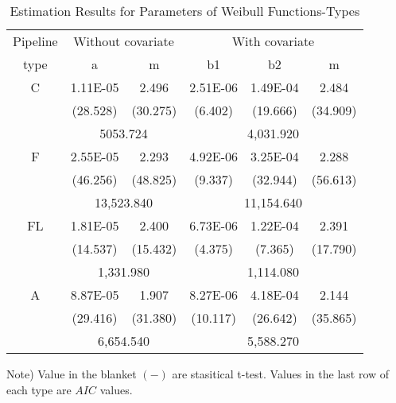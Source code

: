\documentclass[a4paper,oneside,onecolumn,preprint,10pt,authoryear]{elsarticle}
\begin{document}
\begin{table}%
\label{table51}
\caption{Estimation Results for Parameters of Weibull Functions-Types}
{\small
\begin{center}
\begin{tabular}{l|ll|lll}
\hline
\multicolumn{1}{c|}{Pipeline} & \multicolumn{2}{c|}{Without covariate} & \multicolumn{3}{c}{With covariate} \\ 
\multicolumn{1}{c|}{type} & \multicolumn{1}{c}{a} & \multicolumn{1}{c|}{m} & \multicolumn{1}{c}{b1} & \multicolumn{1}{c}{b2} & \multicolumn{1}{c}{m} \\ 
\hline
\multicolumn{1}{c|}{C} & \multicolumn{1}{c}{1.11E-05} & \multicolumn{1}{c|}{2.496} & \multicolumn{1}{c}{2.51E-06} & \multicolumn{1}{c}{1.49E-04} & \multicolumn{1}{c}{2.484} \\ 
\multicolumn{1}{c|}{} & \multicolumn{1}{c}{(28.528)} & \multicolumn{1}{c|}{(30.275)} & \multicolumn{1}{c}{(6.402)} & \multicolumn{1}{c}{(19.666)} & \multicolumn{1}{c}{(34.909)} \\ 
\multicolumn{1}{c|}{} & \multicolumn{2}{c|}{5053.724 } & \multicolumn{3}{c}{4,031.920 } \\ 
\hline
\multicolumn{1}{c|}{F} & \multicolumn{1}{c}{2.55E-05} & \multicolumn{1}{c|}{2.293} & \multicolumn{1}{c}{4.92E-06} & \multicolumn{1}{c}{3.25E-04} & \multicolumn{1}{c}{2.288} \\ 
\multicolumn{1}{c|}{} & \multicolumn{1}{c}{(46.256)} & \multicolumn{1}{c|}{(48.825)} & \multicolumn{1}{c}{(9.337)} & \multicolumn{1}{c}{(32.944)} & \multicolumn{1}{c}{(56.613)} \\ 
\multicolumn{1}{c|}{} & \multicolumn{2}{c|}{13,523.840 } & \multicolumn{3}{c}{11,154.640 } \\ 
\hline
\multicolumn{1}{c|}{FL} & \multicolumn{1}{c}{1.81E-05} & \multicolumn{1}{c|}{2.400} & \multicolumn{1}{c}{6.73E-06} & \multicolumn{1}{c}{1.22E-04} & \multicolumn{1}{c}{2.391} \\ 
\multicolumn{1}{c|}{} & \multicolumn{1}{c}{(14.537)} & \multicolumn{1}{c|}{(15.432)} & \multicolumn{1}{c}{(4.375)} & \multicolumn{1}{c}{(7.365)} & \multicolumn{1}{c}{(17.790)} \\ 
\multicolumn{1}{c|}{} & \multicolumn{2}{c|}{1,331.980 } & \multicolumn{3}{c}{1,114.080 } \\ 
\hline
\multicolumn{1}{c|}{A} & \multicolumn{1}{c}{8.87E-05} & \multicolumn{1}{c|}{1.907} & \multicolumn{1}{c}{8.27E-06} & \multicolumn{1}{c}{4.18E-04} & \multicolumn{1}{c}{2.144} \\ 
\multicolumn{1}{c|}{} & \multicolumn{1}{c}{(29.416)} & \multicolumn{1}{c|}{(31.380)} & \multicolumn{1}{c}{(10.117)} & \multicolumn{1}{c}{(26.642)} & \multicolumn{1}{c}{(35.865)} \\ 
\multicolumn{1}{c|}{} & \multicolumn{2}{c|}{6,654.540 } & \multicolumn{3}{c}{5,588.270 } \\ 
\hline
\end{tabular}
\end{center}
}
{\small Note) Value in the blanket $(-)$ are stasitical t-test. Values in the last row of each type are $AIC$ values.}
\end{table}%
%
\end{document}
